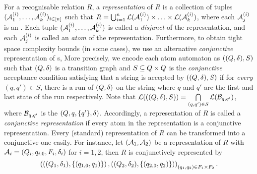 For a recognisable relation $R$, a \emph{representation} of $R$ is a collection of tuples $(\mathcal{A}^{(i)}_1, \ldots, \mathcal{A}^{(i)}_k)_{i\in [n]}$  such that 
$R = \bigcup_{i=1}^n \mathcal{L}(\mathcal{A}^{(i)}_1) \times \ldots\times \mathcal{L}(\mathcal{A}^{(i)}_k)$, where each $\mathcal{A}^{(i)}_j$ is an \FA. 
Each tuple $(\mathcal{A}^{(i)}_1, \ldots, \mathcal{A}^{(i)}_k)$ is called a \emph{disjunct} of the representation, and  each \FA{} $\mathcal{A}^{(i)}_j$ is called an \emph{atom} of the representation.
%
Furthermore, to obtain tight space complexity bounds (in some cases), we use an alternative  \emph{conjunctive} representation of \FA{}s, %
More precisely, we encode each atom automaton as $((Q, \delta), S)$ such that $(Q, \delta)$ is a transition graph and $S \subseteq Q \times Q$ is the \emph{conjunctive} acceptance condition satisfying that a string is accepted by $((Q, \delta), S)$ if for \emph{every} $(q, q') \in S$, there is a run of $(Q, \delta)$ on the string where $q$ and $q'$ are the first and last state of the run respectively. 
%
Note that $\mathcal{L}(((Q, \delta), S)) = \bigcap \limits_{(q,q') \in S} \mathcal{L}(\mathcal{B}_{q,q'})$, where $\mathcal{B}_{q,q'}$ is the \FA{} $(Q, q, \{q'\}, \delta)$.
%
%
Accordingly, a representation of $R$ is called a \emph{conjunctive representation} if every atom in the representation is a conjunctive representation.
Every (standard) representation of $R$  can be transformed into a conjunctive one easily. For instance, let $(\mathcal{A}_1, \mathcal{A}_2)$ be a representation of $R$ with $\mathcal{A}_i = (Q_i, q_{i,0}, F_i, \delta_i)$ for $i=1,2$, then $R$ is conjunctively represented by 
%
$$\left(\left((Q_1, \delta_1), \{(q_{1,0}, q_1)\}\right), \left((Q_2, \delta_2), \{(q_{2,0}, q_2)\} \right)\right)_{(q_1, q_2) \in F_1 \times  F_2}.$$

%

